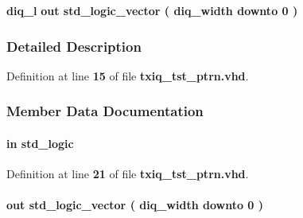 \begin{DoxyCompactItemize}
\item 
{\bf diq\+\_\+l}  {\bfseries {\bfseries \textcolor{keywordflow}{out}\textcolor{vhdlchar}{ }}} {\bfseries \textcolor{comment}{std\+\_\+logic\+\_\+vector}\textcolor{vhdlchar}{ }\textcolor{vhdlchar}{(}\textcolor{vhdlchar}{ }\textcolor{vhdlchar}{ }\textcolor{vhdlchar}{ }\textcolor{vhdlchar}{ }{\bfseries {\bf diq\+\_\+width}} \textcolor{vhdlchar}{ }\textcolor{keywordflow}{downto}\textcolor{vhdlchar}{ }\textcolor{vhdlchar}{ } \textcolor{vhdldigit}{0} \textcolor{vhdlchar}{ }\textcolor{vhdlchar}{)}\textcolor{vhdlchar}{ }} 
\end{DoxyCompactItemize}


\subsubsection{Detailed Description}


Definition at line {\bf 15} of file {\bf txiq\+\_\+tst\+\_\+ptrn.\+vhd}.



\subsubsection{Member Data Documentation}
\paragraph[{clk}]{ {\bfseries \textcolor{keywordflow}{in}\textcolor{vhdlchar}{ }} {\bfseries \textcolor{comment}{std\+\_\+logic}\textcolor{vhdlchar}{ }} \hspace{0.3cm}{\ttfamily [Port]}}\label{classtxiq__tst__ptrn_a4a4609c199d30b3adebbeb3a01276ec5}


Definition at line {\bf 21} of file {\bf txiq\+\_\+tst\+\_\+ptrn.\+vhd}.

\paragraph[{diq\+\_\+h}]{ {\bfseries \textcolor{keywordflow}{out}\textcolor{vhdlchar}{ }} {\bfseries \textcolor{comment}{std\+\_\+logic\+\_\+vector}\textcolor{vhdlchar}{ }\textcolor{vhdlchar}{(}\textcolor{vhdlchar}{ }\textcolor{vhdlchar}{ }\textcolor{vhdlchar}{ }\textcolor{vhdlchar}{ }{\bfseries {\bf diq\+\_\+width}} \textcolor{vhdlchar}{ }\textcolor{keywordflow}{downto}\textcolor{vhdlchar}{ }\textcolor{vhdlchar}{ } \textcolor{vhdldigit}{0} \textcolor{vhdlchar}{ }\textcolor{vhdlchar}{)}\textcolor{vhdlchar}{ }} \hspace{0.3cm}{\ttfamily [Port]}}\label{classtxiq__tst__ptrn_a918b13cef611bea417f2b37e8fe90f68}



